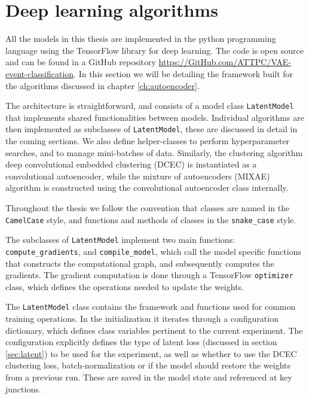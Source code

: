 \section{Deep learning algorithms}

All the models in this thesis are implemented in the python programming language using the TensorFlow library for deep learning. The code is open source and can be found in a GitHub repository \url{https://GitHub.com/ATTPC/VAE-event-classification}. In this section we will be detailing the framework built for the algorithms discussed in chapter \ref{ch:autoencoder}.

The architecture is straightforward, and consists of a model class \lstinline{LatentModel} that implements shared functionalities between models. Individual algorithms are then implemented as subclasses of \lstinline{LatentModel}, these are discussed in detail in the coming sections. We also define helper-classes to perform hyperparameter searches, and to manage mini-batches of data. Similarly, the clustering algorithm deep convolutional embedded clustering (DCEC) is instantiated as a convolutional autoencoder, while the mixture of autoencoders (MIXAE) algorithm is constructed using the convolutional autoencoder class internally. 

Throughout the thesis we follow the convention that classes are named in the \lstinline{CamelCase} style, and functions and methods of classes in the \lstinline{snake_case} style. 

The subclasses of \lstinline{LatentModel} implement two main functions: \lstinline{compute_gradients}, and \lstinline{compile_model}, which call the model specific functions that constructs the computational graph, and subsequently computes the gradients. The gradient computation is done through a TensorFlow \lstinline{optimizer} class, which defines the operations needed to update the weights. 

The \lstinline{LatentModel} class contains the framework and functions used for common training operations. In the initialization it iterates through a configuration dictionary, which defines class variables pertinent to the current experiment. The configuration explicitly defines the type of latent loss (discussed in section \ref{sec:latent}) to be used for the experiment, as well as whether to use the DCEC clustering loss, batch-normalization or if the model should restore the weights from a previous run. These are saved in the model state and referenced at key junctions.

